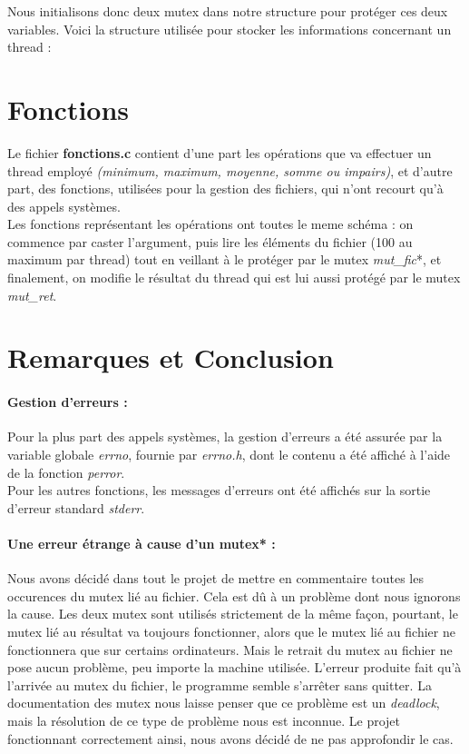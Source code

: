 \documentclass[a4]{article}
\begin{document}
			Nous initialisons donc deux mutex dans notre structure pour protéger ces deux variables. Voici la structure utilisée pour stocker 
			les informations concernant un thread :
			
			
	\section{Fonctions}
			Le fichier \textbf{fonctions.c} contient d'une part les opérations que va effectuer un thread employé 
			\textit{(minimum, maximum, moyenne, somme ou impairs)}, et d'autre part, des fonctions, utilisées pour la gestion des fichiers, qui n'ont 
			recourt qu'à des appels systèmes.\\
			Les fonctions représentant les opérations ont toutes le meme schéma : on commence par caster l’argument, puis lire les éléments du 
			fichier (100 au maximum par thread) tout en veillant à le protéger par le mutex \textit{mut\_fic}*, et finalement, on modifie le 
			résultat du thread qui est lui aussi protégé par le mutex \textit{mut\_ret}.
	

	\section{Remarques et Conclusion}
		\paragraph{Gestion d'erreurs :\\}
			Pour la plus part des appels systèmes, la gestion d'erreurs a été assurée par la variable globale \textit{errno}, fournie par 
			\textit{errno.h}, dont le contenu a été affiché à l'aide de la fonction \textit{perror}.\\
			Pour les autres fonctions, les messages d'erreurs ont été affichés sur la sortie d'erreur standard \textit{stderr}.
		\paragraph{Une erreur étrange à cause d'un mutex* :\\}
			Nous avons décidé dans tout le projet de mettre en commentaire toutes les occurences du mutex lié au fichier.
			Cela est dû à un problème dont nous ignorons la cause. Les deux mutex sont utilisés strictement de la même façon, pourtant,
			le mutex lié au résultat va toujours fonctionner, alors que le mutex lié au fichier ne fonctionnera que sur certains ordinateurs.
			Mais le retrait du mutex au fichier ne pose aucun problème, peu importe la machine utilisée.
			L'erreur produite fait qu'à l'arrivée au mutex du fichier, le programme semble s'arrêter sans quitter. La documentation
			des mutex nous laisse penser que ce problème est un \textit{deadlock}, mais la résolution de ce type de problème nous est inconnue.
			Le projet fonctionnant correctement ainsi, nous avons décidé de ne pas approfondir le cas.
		
\end{document}
